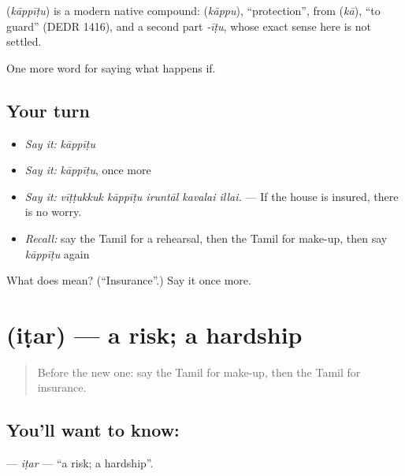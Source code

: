 \begin{cousinweb}
\textbf{} (\emph{kāppīṭu}) is a modern native compound:  (\emph{kāppu}), \textquotedblleft{}protection\textquotedblright{}, from  (\emph{kā}), \textquotedblleft{}to guard\textquotedblright{} (DEDR 1416), and a second part \emph{-īṭu}, whose exact sense here is not settled.
\end{cousinweb}

\begin{grammarlens}[title={What you've built}]
One more word for saying what happens if.
\end{grammarlens}

\subsection*{Your turn}
\begin{itemize}
\raggedright
  \item \emph{Say it:} \emph{kāppīṭu}
  \item \emph{Say it:} \emph{kāppīṭu}, once more
  \item \emph{Say it:} \emph{vīṭṭukkuk kāppīṭu iruntāl kavalai illai.} — If the house is insured, there is no worry.
  \item \emph{Recall:} say the Tamil for a rehearsal, then the Tamil for make-up, then say \emph{kāppīṭu} again
\end{itemize}

\begin{tcolorbox}[breakable,colback=teal!4,colframe=teal!35!black,title={Before you move on}]
What does  mean? (\textquotedblleft{}Insurance\textquotedblright{}.) Say it once more.
\end{tcolorbox}
\section[\texorpdfstring{\ta{இடர்} (iṭar)}{இடர் (iṭar)}]{ (iṭar) — a risk; a hardship}

\label{lesson:TA-C541-itar}



\begin{quote}
Before the new one: say the Tamil for make-up, then the Tamil for insurance.
\end{quote}

\subsection*{You'll want to know: }
\textbf{} — \emph{iṭar} — \textquotedblleft{}a risk; a hardship\textquotedblright{}.

